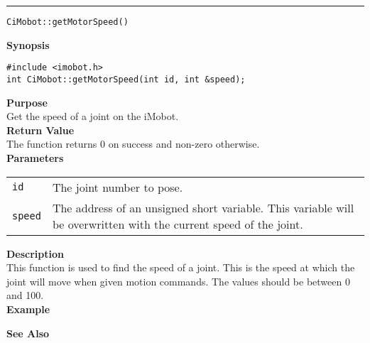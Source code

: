 \noindent
\vspace{5pt}
\rule{6.5in}{0.015in}
\noindent
{\LARGE \texttt{CiMobot::getMotorSpeed()}}\\
{}

\noindent
{\bf Synopsis}\\
\begin{verbatim}
#include <imobot.h>
int CiMobot::getMotorSpeed(int id, int &speed);
\end{verbatim}

\noindent
{\bf Purpose}\\
Get the speed of a joint on the iMobot.\\

\noindent
{\bf Return Value}\\
The function returns 0 on success and non-zero otherwise.\\

\noindent
{\bf Parameters}
\vspace{-0.1in}
\begin{description}
\item               
\begin{tabular}{p{10 mm}p{145 mm}}
\texttt{id} & The joint number to pose. \\
\texttt{speed} & The address of an unsigned short variable. This variable will be overwritten
with the current speed of the joint.
\end{tabular}
\end{description}

\noindent
{\bf Description}\\
This function is used to find the speed of a joint.  This is the speed at which the joint will move when given motion commands. The values should be between 0 and 100. \\

\noindent
{\bf Example}\\
\noindent

\noindent
{\bf See Also}\\

